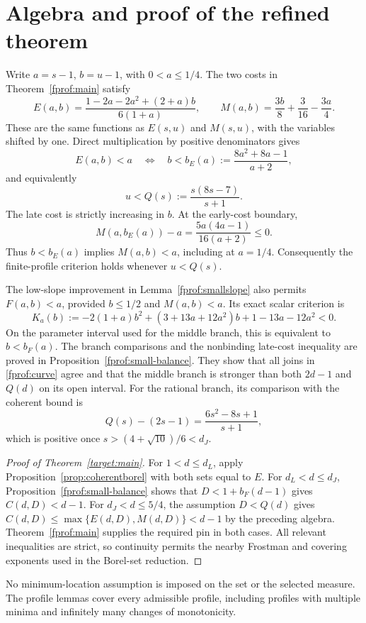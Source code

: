 \documentclass[11pt]{article}
\theoremstyle{definition}\newtheorem{remark}[theorem]{Remark}
\begin{document}
\section{Algebra and proof of the refined theorem}
Write \(a=s-1\), \(b=u-1\), with \(0<a\le1/4\). The two costs in
Theorem~\ref{fprof:main} satisfy
$$
 E(a,b)=\frac{1-2a-2a^2+(2+a)b}{6(1+a)},\qquad
 M(a,b)=\frac{3b}{8}+\frac3{16}-\frac{3a}{4}.
$$
These are the same functions as \(E(s,u)\) and \(M(s,u)\), with the variables
shifted by one. Direct multiplication by positive denominators gives
$$
 E(a,b)<a\quad\Longleftrightarrow\quad
 b<b_E(a):=\frac{8a^2+8a-1}{a+2},
$$
and equivalently
$$
 u<Q(s):=\frac{s(8s-7)}{s+1}.
$$
The late cost is strictly increasing in \(b\). At the early-cost boundary,
$$
 M(a,b_E(a))-a=\frac{5a(4a-1)}{16(a+2)}\le0.
$$
Thus \(b<b_E(a)\) implies \(M(a,b)<a\), including at \(a=1/4\).
Consequently the finite-profile criterion holds whenever \(u<Q(s)\).

The low-slope improvement in Lemma~\ref{fprof:smallslope} also permits
\(F(a,b)<a\), provided \(b\le1/2\) and \(M(a,b)<a\). Its exact scalar criterion is
$$
 K_a(b):=-2(1+a)b^2+(3+13a+12a^2)b+1-13a-12a^2<0.
$$
On the parameter interval used for the middle branch, this is equivalent to
\(b<b_F(a)\). The branch comparisons and the nonbinding late-cost inequality
are proved in Proposition~\ref{fprof:small-balance}. They show that all joins in
\eqref{fprof:curve} agree and that the middle branch is stronger than both
\(2d-1\) and \(Q(d)\) on its open interval.
For the rational branch, its comparison with the coherent bound is
$$
 Q(s)-(2s-1)=\frac{6s^2-8s+1}{s+1},
$$
which is positive once \(s>(4+\sqrt{10})/6<d_J\).

\begin{proof}[Proof of Theorem~\ref{target:main}]
For \(1<d\le d_L\), apply Proposition~\ref{prop:coherentborel} with both sets
 equal to \(E\). For \(d_L<d\le d_J\),
Proposition~\ref{fprof:small-balance} shows that \(D<1+b_F(d-1)\) gives
\(C(d,D)<d-1\). For \(d_J<d\le5/4\), the assumption \(D<Q(d)\) gives
\(C(d,D)\le\max\{E(d,D),M(d,D)\}<d-1\) by the preceding algebra.
Theorem~\ref{fprof:main} supplies the required pin in both cases.
All relevant inequalities are strict, so continuity permits the nearby Frostman
and covering exponents used in the Borel-set reduction.
\end{proof}
No minimum-location assumption is imposed on the set or the selected measure.
The profile lemmas cover every admissible profile, including profiles with
multiple minima and infinitely many changes of monotonicity.
\end{document}
